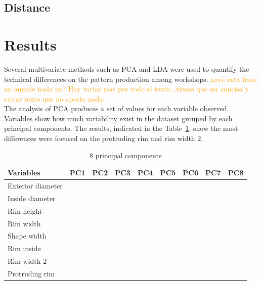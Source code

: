 \documentclass[review]{elsarticle}
\newcommand{\memo}[2]{\textcolor{#1}{#2}}
\newcommand{\xavi}[1]{\memo{orange}{xavi: #1\\}}
\begin{document}

\subsection{Distance}


\section{Results}

Several multivariate methods such as PCA and LDA were used to quantify the technical differences on the pattern production among workshops. \xavi{esta frase no anyade nada no? Hay varias mas por todo el texto...tienes que ser concisa y evitar texto que no aporte nada: }The analysis of PCA produces a set of values for each variable observed. Variables show how much variability exist in the dataset grouped by each principal components. The results, indicated in the Table~\ref{table:variable}, show the most differences were focused on the protruding rim and rim width 2. 

\begin{table}[htp]
\begin{tabular}{lcccccccc}
\hline
 Variables		&        PC1 & PC2	& PC3 & PC4 & PC5 & PC6 & PC7 & PC8     \\ \hline
 Exterior diameter	& 		 &		&	  &  	&	  &	    &     &           \\
 Inside diameter  	& 		 &		&	  &   	&	  &	    &     &           \\
 Rim height          &        &      &     &     &     &     &     &           \\
 Rim width        	&		 &		&	  &  	&	  &		&	  &          \\
 Shape width         &		 &		&	  &  	&	  &		&     &          \\
 Rim inside          &		 &	    &	  &     &	  &		&	  &          \\                                    
 Rim width 2		     & 	     &	    &	  & 		&	  &		&	  &          \\	
 Protruding rim		&        &      &      &     &     &     &     &          \\
\hline
\end{tabular}
\caption{8 principal components}
\label{table:variable}
\end{table}
\end{document}
